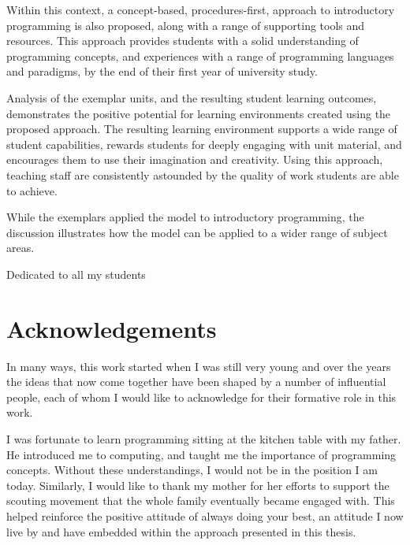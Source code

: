 Within this context, a concept-based, procedures-first, approach to introductory programming is also proposed, along with a range of supporting tools and resources. This approach provides students with a solid understanding of programming concepts, and experiences with a range of programming languages and paradigms, by the end of their first year of university study. 

Analysis of the exemplar units, and the resulting student learning outcomes, demonstrates the positive potential for learning environments created using the proposed approach. The resulting learning environment supports a wide range of student capabilities, rewards students for deeply engaging with unit material, and encourages them to use their imagination and creativity. Using this approach, teaching staff are consistently astounded by the quality of work students are able to achieve.

While the exemplars applied the model to introductory programming, the discussion illustrates how the model can be applied to a wider range of subject areas. 

\cleardoublepage

\newpage \vspace*{8cm} 
\begin{center}
	\large Dedicated to all my students
\end{center}


\cleardoublepage

\chapter*{Acknowledgements}
\vspace{-0.5cm}
In many ways, this work started when I was still very young and over the years the ideas that now come together have been shaped by a number of influential people, each of whom I would like to acknowledge for their formative role in this work.

I was fortunate to learn programming sitting at the kitchen table with my father. He introduced me to computing, and taught me the importance of programming concepts. Without these understandings, I would not be in the position I am today. Similarly, I would like to thank my mother for her efforts to support the scouting movement that the whole family eventually became engaged with. This helped reinforce the positive attitude of always doing your best, an attitude I now live by and have embedded within the approach presented in this thesis.

